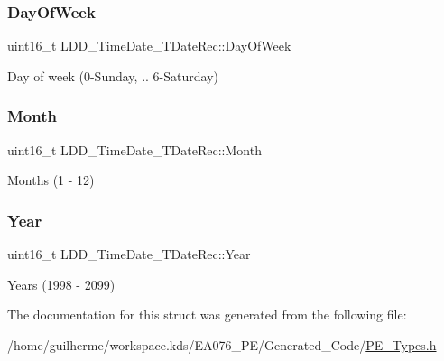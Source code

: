 \subsubsection{\texorpdfstring{Day\+Of\+Week}{DayOfWeek}}
{\footnotesize\ttfamily uint16\+\_\+t L\+D\+D\+\_\+\+Time\+Date\+\_\+\+T\+Date\+Rec\+::\+Day\+Of\+Week}

Day of week (0-\/\+Sunday, .. 6-\/\+Saturday) \mbox{\label{struct_l_d_d___time_date___t_date_rec_a28aaeffe98b07d60db379d12269fa822}} 
\subsubsection{\texorpdfstring{Month}{Month}}
{\footnotesize\ttfamily uint16\+\_\+t L\+D\+D\+\_\+\+Time\+Date\+\_\+\+T\+Date\+Rec\+::\+Month}

Months (1 -\/ 12) \mbox{\label{struct_l_d_d___time_date___t_date_rec_a58eee644efb4f46adc3437063c7bc194}} 
\subsubsection{\texorpdfstring{Year}{Year}}
{\footnotesize\ttfamily uint16\+\_\+t L\+D\+D\+\_\+\+Time\+Date\+\_\+\+T\+Date\+Rec\+::\+Year}

Years (1998 -\/ 2099) 

The documentation for this struct was generated from the following file\+:\begin{DoxyCompactItemize}
\item 
/home/guilherme/workspace.\+kds/\+E\+A076\+\_\+\+P\+E/\+Generated\+\_\+\+Code/\hyperlink{_p_e___types_8h}{P\+E\+\_\+\+Types.\+h}\end{DoxyCompactItemize}
